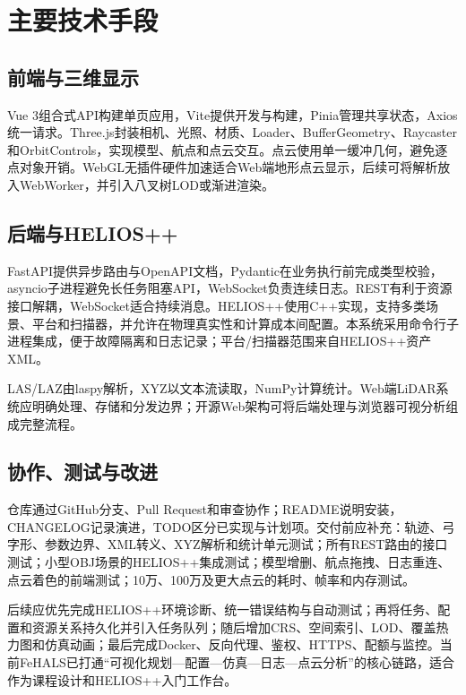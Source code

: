 \documentclass[a4paper,fleqn]{cas-sc}
\begin{document}
\section{主要技术手段}

\subsection{前端与三维显示}

Vue 3组合式API构建单页应用，Vite提供开发与构建，Pinia管理共享状态，Axios统一请求。Three.js封装相机、光照、材质、Loader、BufferGeometry、Raycaster和OrbitControls\citep{threejs}，实现模型、航点和点云交互。点云使用单一缓冲几何，避免逐点对象开销。WebGL无插件硬件加速适合Web端地形点云显示\citep{pointCloudTerrain}，后续可将解析放入WebWorker，并引入八叉树LOD或渐进渲染\citep{pointCloudRendering}。

\subsection{后端与HELIOS++}

FastAPI提供异步路由与OpenAPI文档\citep{fastapi}，Pydantic在业务执行前完成类型校验\citep{pydantic}，asyncio子进程避免长任务阻塞API，WebSocket负责连续日志\citep{WebSocket}。REST有利于资源接口解耦\citep{fielding2000rest}，WebSocket适合持续消息。HELIOS++使用C++实现，支持多类场景、平台和扫描器，并允许在物理真实性和计算成本间配置\citep{heliosPlusPlus}。本系统采用命令行子进程集成，便于故障隔离和日志记录；平台/扫描器范围来自HELIOS++资产XML。

LAS/LAZ由laspy解析\citep{laspy}，XYZ以文本流读取，NumPy计算统计。Web端LiDAR系统应明确处理、存储和分发边界\citep{lidarWebgis}；开源Web架构可将后端处理与浏览器可视分析组成完整流程\citep{viswebdrone}。

\subsection{协作、测试与改进}

仓库通过GitHub分支、Pull Request和审查协作；README说明安装，CHANGELOG记录演进，TODO区分已实现与计划项。交付前应补充：轨迹、弓字形、参数边界、XML转义、XYZ解析和统计单元测试；所有REST路由的接口测试；小型OBJ场景的HELIOS++集成测试；模型增删、航点拖拽、日志重连、点云着色的前端测试；10万、100万及更大点云的耗时、帧率和内存测试。

后续应优先完成HELIOS++环境诊断、统一错误结构与自动测试；再将任务、配置和资源关系持久化并引入任务队列；随后增加CRS、空间索引、LOD、覆盖热力图和仿真动画；最后完成Docker、反向代理、鉴权、HTTPS、配额与监控。当前FeHALS已打通“可视化规划—配置—仿真—日志—点云分析”的核心链路，适合作为课程设计和HELIOS++入门工作台。

\FloatBarrier

\printcredits



\end{document}
